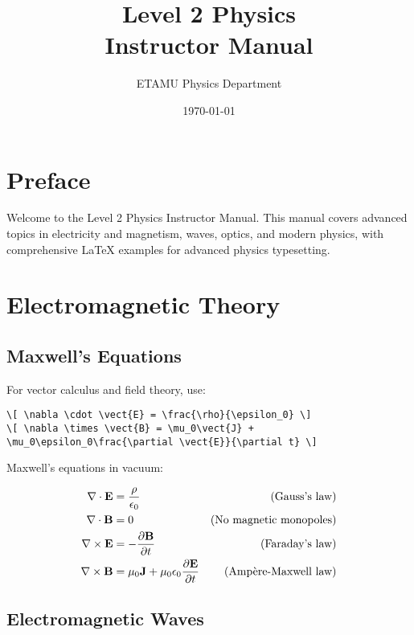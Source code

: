\documentclass[11pt]{book}
\title{Level 2 Physics\\Instructor Manual}
\author{ETAMU Physics Department}
\date{\today}
\begin{document}
\frontmatter
\maketitle

\tableofcontents
\listoffigures

\chapter{Preface}

Welcome to the Level 2 Physics Instructor Manual. This manual covers advanced topics in electricity and magnetism, waves, optics, and modern physics, with comprehensive LaTeX examples for advanced physics typesetting.

\mainmatter

\chapter{Electromagnetic Theory}

\section{Maxwell's Equations}

\begin{tutorialbox}[title=Advanced Mathematical Notation]
For vector calculus and field theory, use:
\begin{verbatim}
\[ \nabla \cdot \vect{E} = \frac{\rho}{\epsilon_0} \]
\[ \nabla \times \vect{B} = \mu_0\vect{J} + \mu_0\epsilon_0\frac{\partial \vect{E}}{\partial t} \]
\end{verbatim}
\end{tutorialbox}

Maxwell's equations in vacuum:

\begin{align}
    \nabla \cdot \mathbf{E} &= \frac{\rho}{\epsilon_0} & \text{(Gauss's law)} \\
    \nabla \cdot \mathbf{B} &= 0 & \text{(No magnetic monopoles)} \\
    \nabla \times \mathbf{E} &= -\frac{\partial \mathbf{B}}{\partial t} & \text{(Faraday's law)} \\
    \nabla \times \mathbf{B} &= \mu_0\mathbf{J} + \mu_0\epsilon_0\frac{\partial \mathbf{E}}{\partial t} & \text{(Ampère-Maxwell law)}
\end{align}

\section{Electromagnetic Waves}
\end{document}
